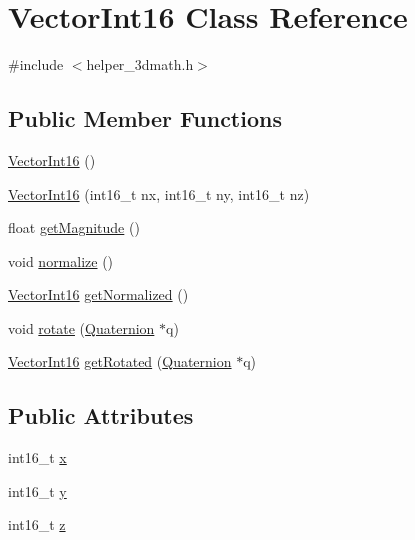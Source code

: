 \hypertarget{classVectorInt16}{}\section{Vector\+Int16 Class Reference}
\label{classVectorInt16}


{\ttfamily \#include $<$helper\+\_\+3dmath.\+h$>$}

\subsection*{Public Member Functions}
\begin{DoxyCompactItemize}
\item 
\mbox{\hyperlink{classVectorInt16_a314bffb747999af26026f734c43d61a2}{Vector\+Int16}} ()
\item 
\mbox{\hyperlink{classVectorInt16_acce45f37b3f90df1d5aff6edbf12f02b}{Vector\+Int16}} (int16\+\_\+t nx, int16\+\_\+t ny, int16\+\_\+t nz)
\item 
float \mbox{\hyperlink{classVectorInt16_aeb8087ac5732450bc18ac944a16d0694}{get\+Magnitude}} ()
\item 
void \mbox{\hyperlink{classVectorInt16_aefdadb30fbc20b564bbbf0b1a885e349}{normalize}} ()
\item 
\mbox{\hyperlink{classVectorInt16}{Vector\+Int16}} \mbox{\hyperlink{classVectorInt16_a1f2c17ac660f1e90a095f9e7914200c5}{get\+Normalized}} ()
\item 
void \mbox{\hyperlink{classVectorInt16_ac7bf149db0a2b66d7683b87ebeb2dfc5}{rotate}} (\mbox{\hyperlink{classQuaternion}{Quaternion}} $\ast$q)
\item 
\mbox{\hyperlink{classVectorInt16}{Vector\+Int16}} \mbox{\hyperlink{classVectorInt16_a9e1d9f4553b069bf353e807f130a285b}{get\+Rotated}} (\mbox{\hyperlink{classQuaternion}{Quaternion}} $\ast$q)
\end{DoxyCompactItemize}
\subsection*{Public Attributes}
\begin{DoxyCompactItemize}
\item 
int16\+\_\+t \mbox{\hyperlink{classVectorInt16_a648435b4c99e9da9c95549ac344beaec}{x}}
\item 
int16\+\_\+t \mbox{\hyperlink{classVectorInt16_a5d340e1f1bcbc064e5084ca609a6a6a3}{y}}
\item 
int16\+\_\+t \mbox{\hyperlink{classVectorInt16_af1b5c4c297bdd32751ab4519480b919f}{z}}
\end{DoxyCompactItemize}



